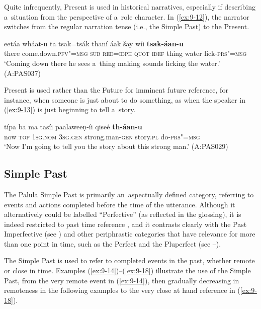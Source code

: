 Quite infrequently, Present is used in historical narratives, especially if describing a~situation from the perspective of a~role character. In (\ref{ex:9-12}), the narrator switches from the regular narration tense (i.e., the Simple Past) to the Present.

\begin{exe}
\ex
\label{ex:9-12}
\gll eetáa wháat-u ta tsak=tsák thaní áak šay wíi \textbf{tsak-áan-u}\\
there come.down.\textsc{pfv"=msg} \textsc{sub} \textsc{red}=\textsc{idph} \textsc{quot} \textsc{idef}  thing water lick-\textsc{prs"=msg}\\
\glt `Coming down there he sees a~thing making sounds licking the water.' (A:PAS037)
\end{exe}

Present is used rather than the Future for imminent future reference, for instance, when someone is just about to do something, as when the speaker in (\ref{ex:9-13}) is just beginning to tell a~story.

\begin{exe}
\ex
\label{ex:9-13}
\gll típa ba ma tasíi paalaweeṇ-íi qiseé \textbf{th-áan-u} \\
now \textsc{top} 1\textsc{sg.nom} 3\textsc{sg.gen} strong.man-\textsc{gen} story.\textsc{pl} do-\textsc{prs"=msg} \\
\glt `Now I'm going to tell you the story about this strong man.' (A:PAS029)
\end{exe}

\subsection{Simple Past}
\label{subsec:9-1-4}


The Palula Simple Past is primarily an~aspectually defined category, referring to events and actions completed before the time of the utterance. Although it alternatively could be labelled ``Perfective'' (as reflected in the glossing), it is indeed restricted to past time reference \citep[79]{dahl1985}, and it contrasts clearly with the Past Imperfective (see ) and other periphrastic categories that have relevance for more than one point in time, such as the Perfect and the Pluperfect (see --).



The Simple Past is used to refer to completed events in the past, whether remote or close in time. Examples (\ref{ex:9-14})--(\ref{ex:9-18}) illustrate the use of the Simple Past, from the very remote event in (\ref{ex:9-14}), then gradually decreasing in remoteness in the following examples to the very close at hand reference in (\ref{ex:9-18}).

